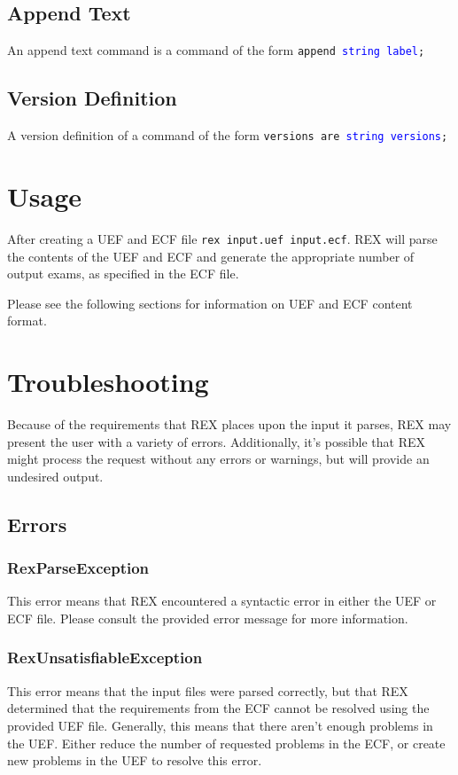 \documentclass{article}
\begin{document}
\subsection{Append Text}
An append text command is a command of the form \texttt{append \textcolor{blue}{string label};}

\subsection{Version Definition}
A version definition of a command of the form \texttt{versions are \textcolor{blue}{string versions};}

\section{Usage}
After creating a UEF and ECF file \texttt{rex input.uef input.ecf}. 
REX will parse the contents of the UEF and ECF and generate the
appropriate number of output exams, as specified in the ECF file.

Please see the following sections for information on UEF and ECF
content format.

\section{Troubleshooting}
Because of the requirements that REX places upon the input it parses,
REX may present the user with a variety of errors. Additionally, it's
possible that REX might process the request without any errors or warnings,
but will provide an undesired output.

\subsection{Errors}
\subsubsection{RexParseException}
This error means that REX encountered a syntactic error in either the
UEF or ECF file. Please consult the provided error message for more
information.

\subsubsection{RexUnsatisfiableException}
This error means that the input files were parsed correctly, but that
REX determined that the requirements from the ECF cannot be resolved
using the provided UEF file. Generally, this means that there aren't
enough problems in the UEF. Either reduce the number of requested
problems in the ECF, or create new problems in the UEF to resolve
this error.
\end{document}
